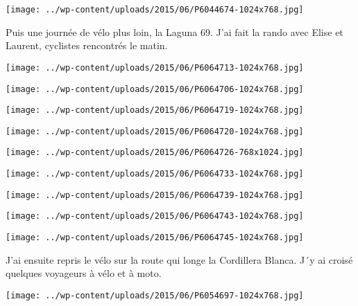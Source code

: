  \newline
 \newline
\centerline{\texttt{[image: ../wp-content/uploads/2015/06/P6044674-1024x768.jpg]} } 
 \newline
 Puis une journée de vélo plus loin, la Laguna 69. J'ai fait la rando avec Elise et Laurent, cyclistes rencontrés le matin. \newline
 \newline
\centerline{\texttt{[image: ../wp-content/uploads/2015/06/P6064713-1024x768.jpg]} } 
 \newline
 \newline
\centerline{\texttt{[image: ../wp-content/uploads/2015/06/P6064706-1024x768.jpg]} } 
 \newline
 \newline
\centerline{\texttt{[image: ../wp-content/uploads/2015/06/P6064719-1024x768.jpg]} } 
 \newline
 \newline
\centerline{\texttt{[image: ../wp-content/uploads/2015/06/P6064720-1024x768.jpg]} } 
 \newline
 \newline
\centerline{\texttt{[image: ../wp-content/uploads/2015/06/P6064726-768x1024.jpg]} } 
 \newline
 \newline
\centerline{\texttt{[image: ../wp-content/uploads/2015/06/P6064733-1024x768.jpg]} } 
 \newline
 \newline
\centerline{\texttt{[image: ../wp-content/uploads/2015/06/P6064739-1024x768.jpg]} } 
 \newline
 \newline
\centerline{\texttt{[image: ../wp-content/uploads/2015/06/P6064743-1024x768.jpg]} } 
 \newline
 \newline
\centerline{\texttt{[image: ../wp-content/uploads/2015/06/P6064745-1024x768.jpg]} } 
 \newline
 J'ai ensuite repris le vélo sur la route qui longe la Cordillera Blanca. J´y ai croisé quelques voyageurs à vélo et à moto. \newline
 \newline
\centerline{\texttt{[image: ../wp-content/uploads/2015/06/P6054697-1024x768.jpg]} } 
 \newline
 \newline

